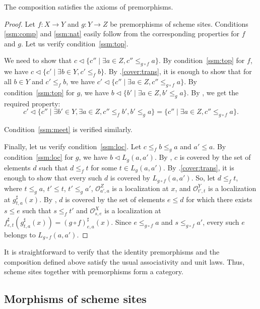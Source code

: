 \documentclass[reqno]{amsart}
\theoremstyle{definition}
\theoremstyle{remark}
\numberwithin{figure}{section}
\newcommand{\cover}{\triangleleft}
\begin{document}
\begin{lem}
The composition satisfies the axioms of premorphisms.
\end{lem}
\begin{proof}
Let $f : X \to Y$ and $g : Y \to Z$ be premorphisms of scheme sites.
Conditions \eqref{ssm:comp} and \eqref{ssm:nat} easily follow from the corresponding properties for $f$ and $g$.
Let us verify condition~\eqref{ssm:top}.

We need to show that $c \cover \{ c'' \mid \exists a \in Z, c'' \leq_{g \circ f} a \}$.
By condition~\eqref{ssm:top} for $f$, we have $c \cover \{ c' \mid \exists b \in Y, c' \leq_f b \}$.
By .\eqref{cover:trans}, it is enough to show that for all $b \in Y$ and $c' \leq_f b$, we have $c' \cover \{ c'' \mid \exists a \in Z, c'' \leq_{g \circ f} a \}$.
By condition~\eqref{ssm:top} for $g$, we have $b \cover \{ b' \mid \exists a \in Z, b' \leq_g a \}$.
By , we get the required property:
\[ c' \cover \{ c'' \mid \exists b' \in Y, \exists a \in Z, c'' \leq_f b', b' \leq_g a \} = \{ c'' \mid \exists a \in Z, c'' \leq_{g \circ f} a \}. \]

Condition~\eqref{ssm:meet} is verified similarly.

Finally, let us verify condition~\eqref{ssm:loc}.
Let $c \leq_f b \leq_g a$ and $a' \leq a$.
By condition~\eqref{ssm:loc} for $g$, we have $b \cover L_g(a,a')$.
By , $c$ is covered by the set of elements $d$ such that $d \leq_f t$ for some $t \in L_g(a,a')$.
By .\eqref{cover:trans}, it is enough to show that every such $d$ is covered by $L_{g \circ f}(a,a')$.
So, let $d \leq_f t$, where $t \leq_g a$, $t' \leq t$, $t' \leq_g a'$, $\mathcal{O}^Z_{a',a}$ is a localization at $x$, and $\mathcal{O}^Y_{t',t}$ is a localization at $g^\sharp_{t,a}(x)$.
By , $d$ is covered by the set of elements $e \leq d$ for which there exists $s \leq e$ such that $s \leq_f t'$ and $\mathcal{O}^X_{s,e}$ is a localization at $f^\sharp_{e,t}(g^\sharp_{t,a}(x)) = (g \circ f)^\sharp_{e,a}(x)$.
Since $e \leq_{g \circ f} a$ and $s \leq_{g \circ f} a'$, every such $e$ belongs to $L_{g \circ f}(a,a')$.
\end{proof}

It is straightforward to verify that the identity premorphisms and the composition defined above satisfy the usual associativity and unit laws.
Thus, scheme sites together with premorphisms form a category.

\subsection{Morphisms of scheme sites}
\end{document}
